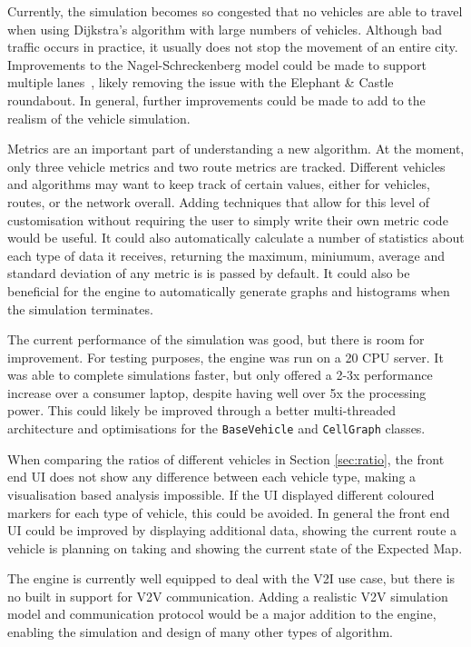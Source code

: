 \documentclass[ %
                    author={Alexander Hill},
                supervisor={Dr. Benjamin Sach},
                    degree={MEng},
                     title={MARMOSET},
                  subtitle={Multi-Agent Route Management using Online Simulation for Efficient Transportation},
                      type={research},
                      year={2016} ]{dissertation}
\begin{document}
Currently, the simulation becomes so congested that no vehicles are able to
travel when using Dijkstra's algorithm with large numbers of vehicles. Although
bad traffic occurs in practice, it usually does not stop the movement of an
entire city. Improvements to the Nagel-Schreckenberg model could be made to
support multiple lanes~\cite{multilanes, twolanes}, likely removing the issue
with the Elephant \& Castle roundabout. In general, further improvements could
be made to add to the realism of the vehicle simulation.

Metrics are an important part of understanding a new algorithm. At the moment,
only three vehicle metrics and two route metrics are tracked.  Different
vehicles and algorithms may want to keep track of certain values, either for
vehicles, routes, or the network overall. Adding techniques that allow for this
level of customisation without requiring the user to simply write their own
metric code would be useful. It could also automatically calculate a number of
statistics about each type of data it receives, returning the maximum, miniumum,
average and standard deviation of any metric is is passed by default.  It could
also be beneficial for the engine to automatically generate graphs and
histograms when the simulation terminates.

The current performance of the simulation was good, but there is room for
improvement. For testing purposes, the engine was run on a 20 CPU server.  It
was able to complete simulations faster, but only offered a 2-3x performance
increase over a consumer laptop, despite having well over 5x the processing
power. This could likely be improved through a better multi-threaded
architecture and optimisations for the \texttt{BaseVehicle} and
\texttt{CellGraph} classes.

When comparing the ratios of different vehicles in Section \ref{sec:ratio}, the
front end UI does not show any difference between each vehicle type, making a
visualisation based analysis impossible. If the UI displayed different
coloured markers for each type of vehicle, this could be avoided. In general the
front end UI could be improved by displaying additional data, showing the
current route a vehicle is planning on taking and showing the current state of
the Expected Map.

The engine is currently well equipped to deal with the V2I use case, but there
is no built in support for V2V communication. Adding a realistic V2V simulation
model and communication protocol would be a major addition to the engine,
enabling the simulation and design of many other types of algorithm.
\end{document}
